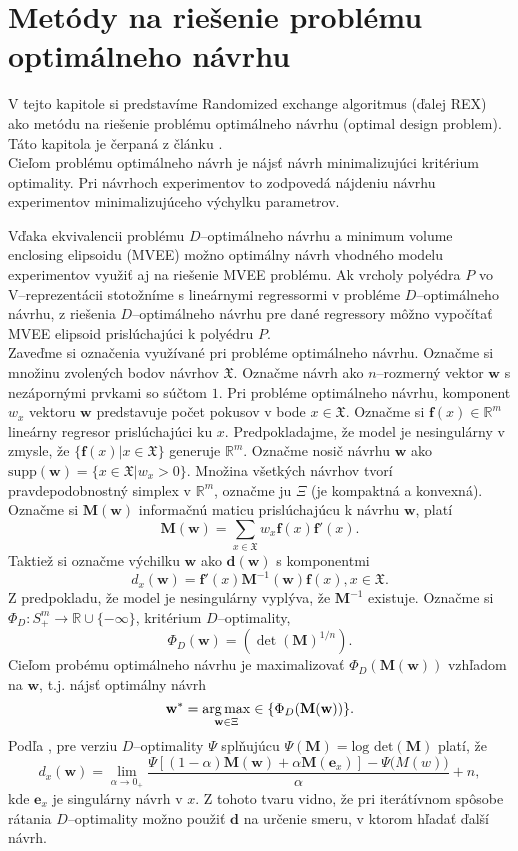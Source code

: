 \chapter{Metódy na riešenie problému optimálneho návrhu}

V tejto kapitole si predstavíme Randomized exchange algoritmus \cite{rex_harman} (ďalej REX) ako metódu na riešenie problému optimálneho návrhu (optimal design problem). Táto kapitola je čerpaná z článku \cite{rex_harman}. \\

Cieľom problému optimálneho návrh je nájsť návrh minimalizujúci kritérium optimality. Pri návrhoch experimentov to zodpovedá nájdeniu návrhu experimentov minimalizujúceho výchylku parametrov.

Vďaka ekvivalencii problému $D$--optimálneho návrhu a minimum volume enclosing elipsoidu (MVEE) možno optimálny návrh vhodného modelu experimentov využiť aj na riešenie MVEE problému. Ak vrcholy polyédra $P$ vo V--reprezentácii stotožníme s lineárnymi regressormi v probléme $D$--optimálneho návrhu, z riešenia $D$--optimálneho návrhu pre dané regressory môžno vypočítať MVEE elipsoid prislúchajúci k polyédru $P$.\\

Zaveďme si označenia využívané pri probléme optimálneho návrhu. Označme si množinu zvolených bodov návrhov $\mathfrak X$.
Označme návrh ako $n$--rozmerný vektor $\mathbf{w}$ s nezápornými prvkami so súčtom $1$. Pri probléme optimálneho návrhu, komponent $w_x$ vektoru $\mathbf{w}$ predstavuje počet pokusov v bode $x \in \mathfrak X$.
Označme si $\mathbf{f}(x)\in \mathbb{R}^m$ lineárny regresor prislúchajúci ku $x$. Predpokladajme, že model je nesingulárny v zmysle, že $\{ \mathbf f(x)|x \in \mathfrak X \}$ generuje $\mathbb R^m$.
Označme nosič návrhu $\mathbf{w}$ ako $\text{supp}(\mathbf{w})=\{x \in \mathfrak{X}| w_x>0\}$. 
Množina všetkých návrhov tvorí pravdepodobnostný simplex v $\mathbb{R}^m$, označme ju $\Xi$ (je kompaktná a konvexná).
Označme si $\mathbf{M(w)}$ informačnú maticu prislúchajúcu k návrhu $\mathbf w$, platí $$\mathbf{M(w)}=\sum_{x\in \mathfrak X}w_x \mathbf{f}(x)\mathbf{f'}(x).$$
Taktiež si označme výchilku $\mathbf w$ ako $\mathbf {d(w)}$ s komponentmi $$d_x(\mathbf w)=\mathbf {f'}(x)\mathbf M^{-1}(\mathbf w)\mathbf f(x), x \in \mathfrak X.$$ Z predpokladu, že model je nesingulárny vyplýva, že $\mathbf M^{-1}$ existuje.
Označme si $\Phi_D: S^m_+ \rightarrow \mathbb{R} \cup \{-\infty\}$, kritérium $D$--optimality, $$\Phi_D(\mathbf{w})=(\det(\mathbf{M})^{1/n}).$$
Cieľom probému optimálneho návrhu je maximalizovať $\Phi_D(\mathbf{M(w)})$ vzhľadom na $\mathbf w$, t.j. nájsť optimálny návrh $$\mathbf{w^*} = \operatorname*{arg\,max}_{\mathbf{w} \in \Xi} \in \{\Phi_D(\mathbf{M(w)})\}.$$ Podľa \cite{rex_harman}, pre verziu $D$--optimality $\Psi$ splňujúcu $\Psi(\mathbf M)= \text{log det}(\mathbf M)$ platí, že $$d_x(\mathbf w)= \lim_{\alpha \rightarrow 0_+} \frac{\Psi[(1-\alpha)\mathbf{M(w)}+\alpha\mathbf M(\mathbf e_x)]-\Psi\mathbf(M(w))}{\alpha}+n,$$ kde $\mathbf e_x$ je singulárny návrh v $x$. Z tohoto tvaru vidno, že pri iterátívnom spôsobe rátania $D$--optimality možno použiť $\mathbf d$ na určenie smeru, v ktorom hľadať ďalší návrh.

